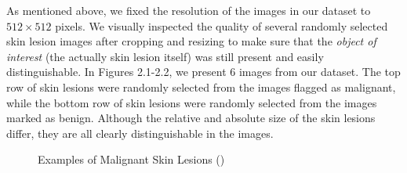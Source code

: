 \documentclass [MAS] {uclathes}
\begin{document}
As mentioned above, we fixed the resolution of the images in our dataset to $512 \times 512$ pixels. We visually inspected the quality of several randomly selected skin lesion images after cropping and resizing to make sure that the \textit{object of interest} (the actually skin lesion itself) was still present and easily distinguishable. In Figures 2.1-2.2, we present 6 images from our dataset. The top row of skin lesions were randomly selected from the images flagged as malignant, while the bottom row of skin lesions were randomly selected from the images marked as benign. Although the relative and absolute size of the skin lesions differ, they are all clearly distinguishable in the images. 

\begin{figure}[hbt!]
\hspace*{\fill}
\centering
{}\hspace{0.5em}
\hspace{0.5em}
\hspace*{\fill}
\label{fig:mel_examples}
\vspace{-1cm}
\caption{Examples of Malignant Skin Lesions (\cite{ISIC})}
\end{figure}
\end{document}
